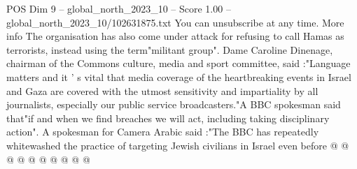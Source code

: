 \begin{textsample}{POS Dim 9 – global\_north\_2023\_10 – Score 1.00 – global\_north\_2023\_10/102631875.txt}
You can unsubscribe at any time.
More info The organisation has also come under attack for refusing to call Hamas as terrorists, instead using the term"militant group".
Dame Caroline Dinenage, chairman of the Commons culture, media and sport committee, said :"Language matters and it ' s vital that media coverage of the heartbreaking events in Israel and Gaza are covered with the utmost sensitivity and impartiality by all journalists, especially our public service broadcasters."A BBC spokesman said that"if and when we find breaches we will act, including taking disciplinary action".
A spokesman for Camera Arabic said :"The BBC has repeatedly whitewashed the practice of targeting Jewish civilians in Israel even before @ @ @ @ @ @ @ @ @ @

\end{textsample}
